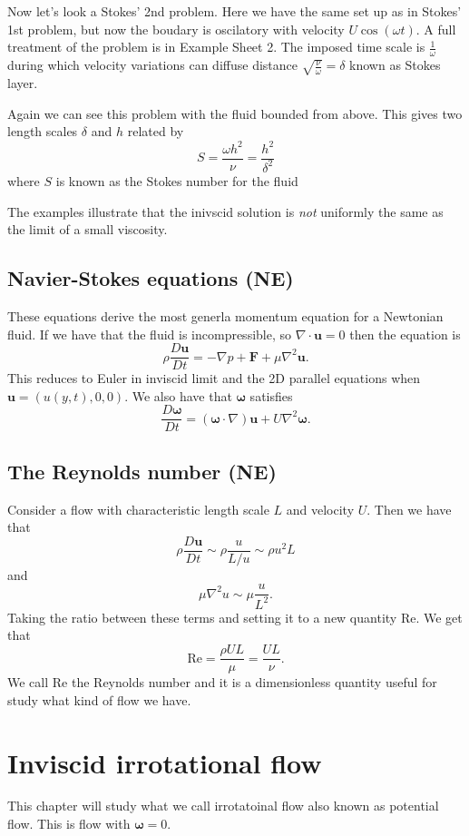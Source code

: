 \documentclass{article}
\begin{document}
\begin{example}
	Now let's look a Stokes' 2nd problem. Here we have the same set up as in Stokes' 1st problem, but now the boudary is oscilatory with velocity $ U\cos(\omega t) $. A full treatment of the problem is in Example Sheet 2. The imposed time scale is $ \frac 1 \omega $ during which velocity variations can diffuse distance $ \sqrt{\frac\nu\omega} = \delta $ known as Stokes layer.
\end{example}
\begin{example}
  Again we can see this problem with the fluid bounded from above. This gives two length scales $ \delta $ and $ h $ related by
  \[
	  S = \frac{\omega h^2}{\nu} = \frac {h^2}{\delta^2}
  \]
  where $ S $ is known as the Stokes number for the fluid 
\end{example}
\begin{remark}
	The examples illustrate that the inivscid solution is \textit{not} uniformly the same as the limit of a small viscosity.
\end{remark}
\subsection{Navier-Stokes equations (NE)}
These equations derive the most generla momentum equation for a Newtonian fluid. If we have that the fluid is incompressible, so $ \nabla\cdot\mathbf u = 0 $ then the equation is
\[
	\rho \frac{D\mathbf u }{Dt} = - \nabla p + \mathbf F + \mu\nabla^2 \mathbf u.
\]
This reduces to Euler in inviscid limit and the 2D parallel equations when $ \mathbf u = (u(y,t),0,0) $. We also have that $ \boldsymbol \omega $ satisfies
\[
	\frac{D\boldsymbol \omega}{Dt} = (\boldsymbol \omega \cdot\nabla)\mathbf u + U\nabla^2 \boldsymbol \omega.
\]
\subsection{The Reynolds number (NE)}
Consider a flow with characteristic length scale $ L $ and velocity $ U $. Then we have that
\[
	\rho \frac{D\mathbf u }{Dt} \sim \rho \frac{u}{L/u} \sim \rho {u^2}L
\]
and
\[
	\mu\nabla^2 u \sim \mu\frac{u}{L^2}.
\]
Taking the ratio between these terms and setting it to a new quantity $ \mathrm {Re} $. We get that
\[
	\mathrm {Re} = \frac{\rho UL}\mu = \frac{UL}\nu.
\]
We call $ \mathrm {Re} $ the Reynolds number and it is a dimensionless quantity useful for study what kind of flow we have.
\section{Inviscid irrotational flow}
This chapter will study what we call irrotatoinal flow also known as potential flow. This is flow with $ \boldsymbol \omega = 0 $. 
\end{document}
